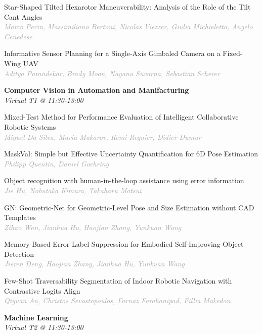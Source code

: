 \begin{multicols*}{2}
\small Star-Shaped Tilted Hexarotor Maneuverability: Analysis of the Role of the Tilt Cant Angles\\ 
\footnotesize \textcolor{darkgray}{\textit{Marco Perin, Massimiliano  Bertoni, Nicolas  Viezzer, Giulia  Michieletto, Angelo  Cenedese}}

\small Informative Sensor Planning for a Single-Axis Gimbaled Camera on a Fixed-Wing UAV\\ 
\footnotesize \textcolor{darkgray}{\textit{Aditya Parandekar, Brady  Moon, Nayana  Suvarna, Sebastian  Scherer}}

\normalsize \textbf{Computer Vision in Automation and Manifacturing}\\
\small \textit{Virtual T1 @ 11:30-13:00}

\small Mixed-Test Method for Performance Evaluation of Intelligent Collaborative Robotic Systems\\ 
\footnotesize \textcolor{darkgray}{\textit{Miguel Da Silva, Maria  Makarov, Remi  Regnier, Didier  Dumur}}

\small MaskVal: Simple but Effective Uncertainty Quantification for 6D Pose Estimation\\ 
\footnotesize \textcolor{darkgray}{\textit{Philipp Quentin, Daniel  Goehring}}

\small Object recognition with human-in-the-loop assistance using error information\\ 
\footnotesize \textcolor{darkgray}{\textit{Jie Hu, Nobutaka  Kimura, Takaharu  Matsui}}

\small GN: Geometric-Net for Geometric-Level Pose and Size Estimation without CAD Templates\\ 
\footnotesize \textcolor{darkgray}{\textit{Zihao Wan, Jianhua  Hu, Haojian  Zhang, Yunkuan  Wang}}

\small Memory-Based Error Label Suppression for Embodied Self-Improving Object Detection\\ 
\footnotesize \textcolor{darkgray}{\textit{Jieren Deng, Haojian  Zhang, Jianhua  Hu, Yunkuan  Wang}}

\small Few-Shot Traversability Segmentation of Indoor Robotic Navigation with Contrastive Logits Align\\ 
\footnotesize \textcolor{darkgray}{\textit{Qiyuan An, Christos  Sevastopoulos, Farnaz  Farahanipad, Fillia  Makedon}}

\normalsize \textbf{Machine Learning}\\
\small \textit{Virtual T2 @ 11:30-13:00}


\end{multicols*}

